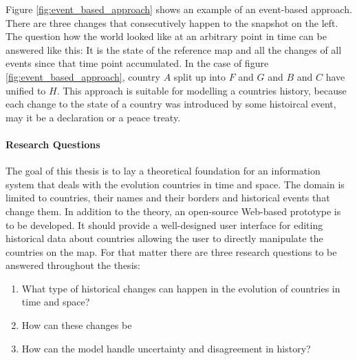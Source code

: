 Figure \ref{fig:event_based_approach} shows an example of an event-based approach. There are three changes that consecutively happen to the snapshot on the left. The question how the world looked like at an arbitrary point in time can be answered like this: It is the state of the reference map and all the changes of all events since that time point accumulated. In the case of figure \ref{fig:event_based_approach}, country $A$ split up into $F$ and $G$ and $B$ and $C$ have unified to $H$. This approach is suitable for modelling a countries history, because each change to the state of a country was introduced by some histoircal event, may it be a declaration or a peace treaty.

\paragraph{Research Questions} %
\label{par:research_questions}

The goal of this thesis is to lay a theoretical foundation for an information system that deals with the evolution countries in time and space. The domain is limited to countries, their names and their borders and historical events that change them. In addition to the theory, an open-source Web-based prototype is to be developed. It should provide a well-designed user interface for editing historical data about countries allowing the user to directly manipulate the countries on the map. For that matter there are three research questions to be answered throughout the thesis:

\begin{enumerate}
  \item What type of historical changes can happen in the evolution of countries in time and space?
  \item How can these changes be
  \item How can the model handle uncertainty and disagreement in history?
\end{enumerate}


\newpage
